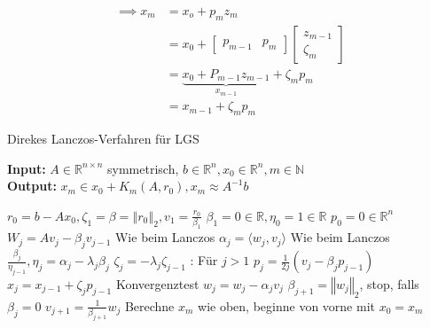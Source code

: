 \documentclass{book}
\def\R{\mathbb{R}}
\def\N{\mathbb{N}}
\begin{document}
            \begin{align*}
                \implies x_m&=x_o+p_mz_m\\
                &= x_0 + \begin{bmatrix}
                    p_{m-1} & p_m
                \end{bmatrix}\begin{bmatrix}
                    z_{m-1}\\
                    \zeta_m
                \end{bmatrix}\\
                &=\underbrace{x_0+P_{m-1}z_{m-1}}_{x_{m-1}}+\zeta_mp_m\\
                &=x_{m-1}+\zeta_mp_m
            \end{align*}

            \begin{algorithm}[H]%
                \caption{Direkes Lanczos-Verfahren für LGS}\label{a3.26} 
                \textbf{Input:} $A\in\R^{n\times n}$ symmetrisch, $b\in\R^n,x_0\in\R^n,m\in\N$\\
                \textbf{Output:} $x_m\in x_0 +K_m(A,r_0), x_m\approx A^{-1}b$
                \begin{algorithmic}
                \State $r_0=b-Ax_0,\zeta_1=\beta=\left\Vert r_0 \right\Vert_2,v_1=\frac{r_0}{\beta_1}$
                \State $\beta_1=0\in\R,\eta_0=1\in\R$
                \State $p_0=0\in\R^n$
                    \State $W_j=Av_j-\beta_jv_{j-1}$ \Comment Wie beim Lanczos
                    \State $\alpha_j=\langle w_j,v_j \rangle$ \Comment Wie beim Lanczos
                    \State $\frac{\beta_j}{\eta_{j-1}},\eta_j=\alpha_j-\lambda_j\beta_j$
                    \State $\zeta_j=-\lambda_j\zeta_{j-1}$ \Comment: Für $j>1$
                    \State $p_j=\frac{1}{2j}(v_j-\beta_jp_{j-1})$
                    \State $x_j=x_{j-1}+\zeta_jp_{j-1}$
                    \State Konvergenztest 
                    \State $w_j=w_j-\alpha_jv_j$
                    \State $\beta_{j+1}=\left\Vert w_j \right\Vert_2$, stop, falls $\beta_j=0$
                    \State $v_{j+1}=\frac{1}{\beta_{j+1}}w_j$
                \EndFor
                \State Berechne $x_m$ wie oben, beginne von vorne mit $x_0=x_m$
                \end{algorithmic}
            \end{algorithm}
\end{document}
